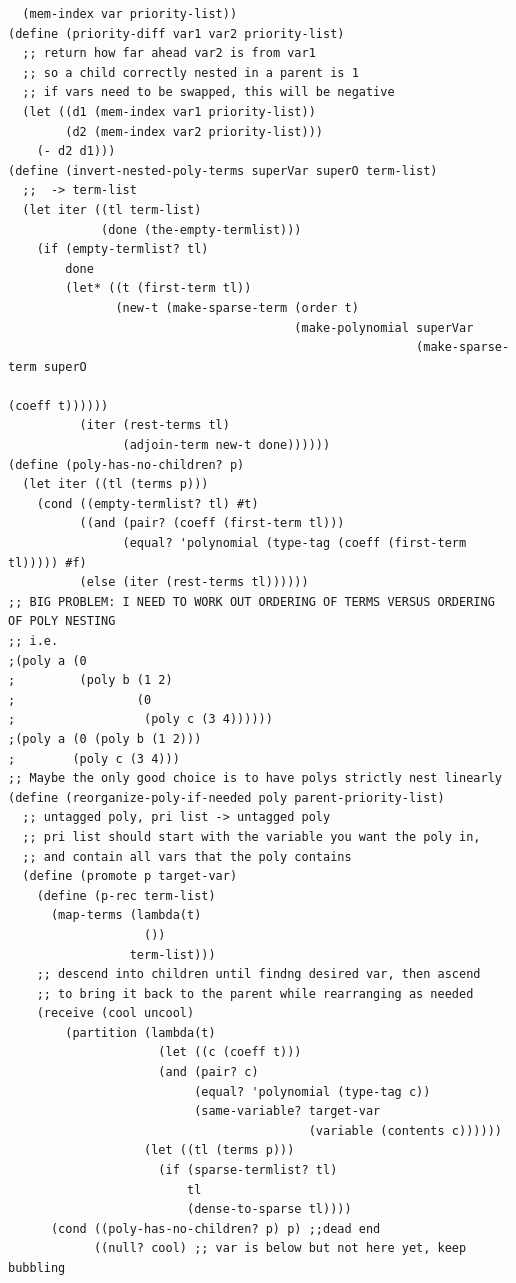\documentclass[final,fleqn,titlepage,twoside]{article}
\begin{document}
\begin{verbatim}
  (mem-index var priority-list))
(define (priority-diff var1 var2 priority-list)
  ;; return how far ahead var2 is from var1
  ;; so a child correctly nested in a parent is 1
  ;; if vars need to be swapped, this will be negative
  (let ((d1 (mem-index var1 priority-list))
        (d2 (mem-index var2 priority-list)))
    (- d2 d1)))
(define (invert-nested-poly-terms superVar superO term-list)
  ;;  -> term-list
  (let iter ((tl term-list)
             (done (the-empty-termlist)))
    (if (empty-termlist? tl)
        done
        (let* ((t (first-term tl))
               (new-t (make-sparse-term (order t)
                                        (make-polynomial superVar
                                                         (make-sparse-term superO
                                                                           (coeff t))))))
          (iter (rest-terms tl)
                (adjoin-term new-t done))))))
(define (poly-has-no-children? p)
  (let iter ((tl (terms p)))
    (cond ((empty-termlist? tl) #t)
          ((and (pair? (coeff (first-term tl)))
                (equal? 'polynomial (type-tag (coeff (first-term tl))))) #f)
          (else (iter (rest-terms tl))))))
;; BIG PROBLEM: I NEED TO WORK OUT ORDERING OF TERMS VERSUS ORDERING OF POLY NESTING
;; i.e.
;(poly a (0
;         (poly b (1 2)
;                 (0
;                  (poly c (3 4))))))
;(poly a (0 (poly b (1 2)))
;        (poly c (3 4)))
;; Maybe the only good choice is to have polys strictly nest linearly
(define (reorganize-poly-if-needed poly parent-priority-list)
  ;; untagged poly, pri list -> untagged poly
  ;; pri list should start with the variable you want the poly in,
  ;; and contain all vars that the poly contains
  (define (promote p target-var)
    (define (p-rec term-list)
      (map-terms (lambda(t)
                   ())
                 term-list)))
    ;; descend into children until findng desired var, then ascend
    ;; to bring it back to the parent while rearranging as needed
    (receive (cool uncool)
        (partition (lambda(t)
                     (let ((c (coeff t)))
                     (and (pair? c)
                          (equal? 'polynomial (type-tag c))
                          (same-variable? target-var
                                          (variable (contents c))))))
                   (let ((tl (terms p)))
                     (if (sparse-termlist? tl)
                         tl
                         (dense-to-sparse tl))))
      (cond ((poly-has-no-children? p) p) ;;dead end
            ((null? cool) ;; var is below but not here yet, keep bubbling

\end{verbatim}
\end{document}
